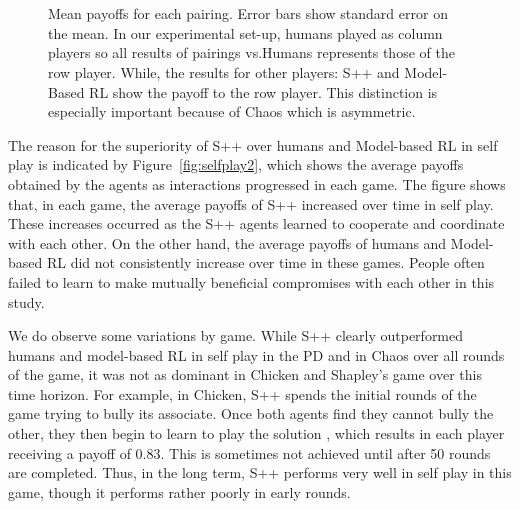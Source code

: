 \documentclass[fleqn,10pt]{SelfArx}
\begin{document}
\begin{figure*}
\begin{center}
	~~~~
	~~~~
	\\ \vspace{-.2in}
	~~~~~
	~~~~~
	 \vspace{-.1in}
\caption{Mean payoffs for each pairing.  Error bars show standard error on the mean. In our experimental set-up, humans played as column players so all results of pairings vs.Humans represents those of the row player. While, the results for other players: S++ and Model-Based RL show the payoff to the row player. This distinction is especially important because of Chaos which is asymmetric.}
\label{fig:againstOthers}
\end{center}
\end{figure*}


The reason for the superiority of S++ over humans and Model-based RL in self play is indicated by Figure~\ref{fig:selfplay2}, which shows the average payoffs obtained by the agents as interactions progressed in each game.  The figure shows that, in each game, the average payoffs of S++ increased over time in self play.  These increases occurred as the S++ agents learned to cooperate and coordinate with each other.  On the other hand, the average payoffs of humans and Model-based RL did not consistently increase over time in these games.  People often failed to learn to make mutually beneficial compromises with each other in this study.

We do observe some variations by game.  While S++ clearly outperformed humans and model-based RL in self play in the PD and in Chaos over all rounds of the game, it was not as dominant in Chicken and Shapley's game over this time horizon.  For example, in Chicken, S++ spends the initial rounds of the game trying to bully its associate.  Once both agents find they cannot bully the other, they then begin to learn to play the solution , which results in each player receiving a payoff of 0.83.  This is sometimes not achieved until after 50 rounds are completed.  Thus, in the long term, S++ performs very well in self play in this game, though it performs rather poorly in early rounds.
\end{document}
